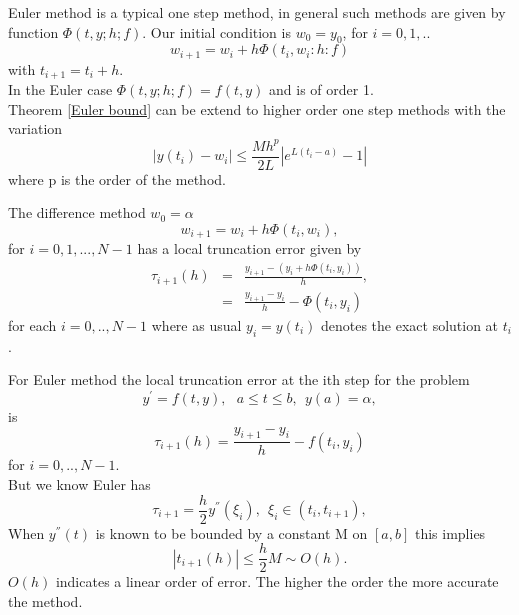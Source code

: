 Euler method is a typical one step method, in general such methods are given by
function $\Phi(t,y;h;f)$. Our initial condition is $w_0=y_0$, for $i=0,1,..$
\[w_{i+1}=w_i+h\Phi(t_i,w_i:h:f)\]
with $t_{i+1}=t_i+h$.\\
In the Euler case $\Phi(t,y;h;f)=f(t,y)$ and is of order 1.\\
Theorem \ref{Euler bound} can be extend to higher order one step methods with the variation 
\[ |y(t_i)-w_i| \leq \frac{Mh^p}{2L}|e^{L(t_i-a)}-1| \]
where p is the order of the method.
\begin{definition}
The difference method $w_0=\alpha$
\[w_{i+1}=w_i+h\Phi(t_i,w_i),\]
for $i=0,1,...,N-1$ has a local truncation error given by
\begin{eqnarray*}
\tau_{i+1}(h) &=&\frac{y_{i+1}-(y_i+h\Phi(t_i,y_i))}{h},\\ 
&=&\frac{y_{i+1}-y_{i}}{h} -\Phi(t_i,y_i)
\end{eqnarray*}
for each $i=0,..,N-1$ where as usual $y_i=y(t_i)$ denotes the exact solution
at $t_i$.
\end{definition}
For Euler method the local truncation error at the ith step for the problem
\[ y^{'} = f(t,y), \ \ \ a\leq t \leq b, \ \ y(a)=\alpha, \]
is
\[\tau_{i+1}(h) =\frac{y_{i+1}-y_{i}}{h} -f(t_i,y_i) \]
for $i=0,..,N-1$.\\
But we know Euler has \[\tau_{i+1}=\frac{h}{2}y^{''}(\xi_i), \ \ \xi_i \in (t_i,t_{i+1}),\]
When $y^{''}(t)$ is known to be bounded by a constant M on $[a,b]$ this implies
\[|t_{i+1}(h)| \leq \frac{h}{2}M \sim O(h). \]
$O(h)$ indicates a linear order of error. The higher the order the more accurate the method.

\newpage

